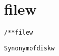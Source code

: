 \section{filew}
\begin{shaded}
\begin{alltt}
/** filew

  Synonym of diskw

\end{alltt}
\end{shaded}
